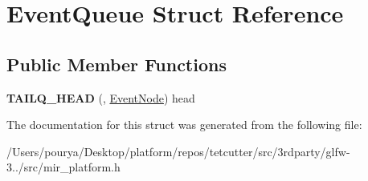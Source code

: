 \hypertarget{structEventQueue}{}\section{Event\+Queue Struct Reference}
\label{structEventQueue}
\subsection*{Public Member Functions}
\begin{DoxyCompactItemize}
\item 
\hypertarget{structEventQueue_abe4470dade7bdc39894b904ed875ff09}{}{\bfseries T\+A\+I\+L\+Q\+\_\+\+H\+E\+A\+D} (, \hyperlink{structEventNode}{Event\+Node}) head\label{structEventQueue_abe4470dade7bdc39894b904ed875ff09}

\end{DoxyCompactItemize}


The documentation for this struct was generated from the following file\+:\begin{DoxyCompactItemize}
\item 
/\+Users/pourya/\+Desktop/platform/repos/tetcutter/src/3rdparty/glfw-\/3../src/mir\+\_\+platform.\+h\end{DoxyCompactItemize}
